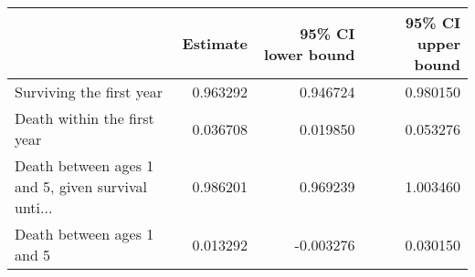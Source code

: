 \begin{tabular}{lrrr}
\toprule
{} &  Estimate &  95\% CI lower bound &  95\% CI upper bound \\
\midrule
Surviving the first year                           &  0.963292 &            0.946724 &            0.980150 \\
Death within the first year                        &  0.036708 &            0.019850 &            0.053276 \\
Death between ages 1 and 5, given survival unti... &  0.986201 &            0.969239 &            1.003460 \\
Death between ages 1 and 5                         &  0.013292 &           -0.003276 &            0.030150 \\
\bottomrule
\end{tabular}
